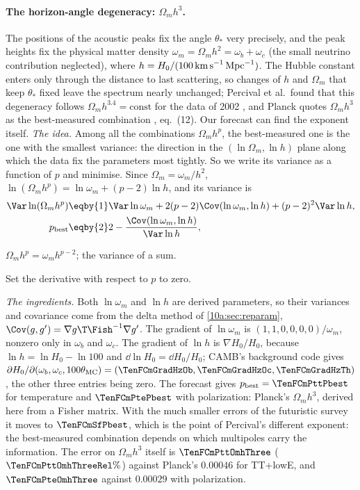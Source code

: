 \paragraph{The horizon-angle degeneracy: $\Omega_mh^3$.} The positions of the acoustic peaks fix the angle $\theta_*$ very
precisely, and the peak heights fix the physical matter density $\omega_m=\Omega_mh^2=\omega_b+\omega_c$ (the small neutrino
contribution neglected), where $h=H_0/(100\,\text{km\,s}^{-1}\,\text{Mpc}^{-1})$. The Hubble constant enters only
through the distance to last scattering, so changes of $h$ and $\Omega_m$ that keep $\theta_*$ fixed leave the spectrum
nearly unchanged; Percival et al.\ found that this degeneracy follows $\Omega_mh^{3.4}=\text{const}$ for the data of 2002
\cite{Percival2002}, and Planck quotes $\Omega_mh^3$ as the best-measured combination \cite{Planck2018VI}, eq.~(12). Our
forecast can find the exponent itself. \emph{The idea.} Among all the combinations $\Omega_mh^p$, the
best-measured one is the one with the smallest variance: the direction in the $(\ln\Omega_m,\ln h)$ plane along which
the data fix the parameters most tightly. So we write its variance as a function of $p$ and minimise. Since
$\Omega_m=\omega_m/h^2$, $\ln(\Omega_mh^p)=\ln\omega_m+(p-2)\ln h$, and its variance is
\begin{align}
  \Var\ln(\Omega_mh^p)
  &\eqby{1}\Var\ln\omega_m+2(p-2)\Cov(\ln\omega_m,\ln h)+(p-2)^2\Var\ln h,
  \nonumber\\
  p_{\rm best}&\eqby{2}2-\frac{\Cov(\ln\omega_m,\ln h)}{\Var\ln h},
  \label{10a:eq:pbest}
\end{align}
\begin{explain}
  \item $\Omega_mh^p=\omega_mh^{p-2}$; the variance of a sum.
  \item Set the derivative with respect to $p$ to zero.
\end{explain}
\emph{The ingredients.} Both $\ln\omega_m$ and $\ln h$ are derived parameters, so their variances and covariance come
from the delta method of \cref{10a:sec:reparam}, $\Cov(g,g')=\nabla g\T\Fish^{-1}\nabla g'$. The gradient of $\ln\omega_m$ is
$(1,1,0,0,0,0)/\omega_m$, nonzero only in $\omega_b$ and $\omega_c$. The gradient of $\ln h$ is $\nabla H_0/H_0$, because
$\ln h=\ln H_0-\ln100$ and $\dd\ln H_0=\dd H_0/H_0$; CAMB's background code gives
$\partial H_0/\partial(\omega_b,\omega_c,100\theta_{\rm MC})=(\TenFCmGradHzOb,\TenFCmGradHzOc,\TenFCmGradHzTh)$, the other three entries being zero.
The forecast gives
$p_{\rm best}=\TenFCmPttPbest$ for temperature and $\TenFCmPtePbest$ with polarization: Planck's $\Omega_mh^3$, derived here from a
Fisher matrix. With the much smaller errors of the futuristic survey it moves to $\TenFCmSfPbest$, which is the point
of Percival's different exponent: the best-measured combination depends on which multipoles carry the
information. The error on $\Omega_mh^3$ itself is $\TenFCmPttOmhThree$ ($\TenFCmPttOmhThreeRel\%$) against Planck's $0.00046$ for TT+lowE,
and $\TenFCmPteOmhThree$ against $0.00029$ with polarization.

